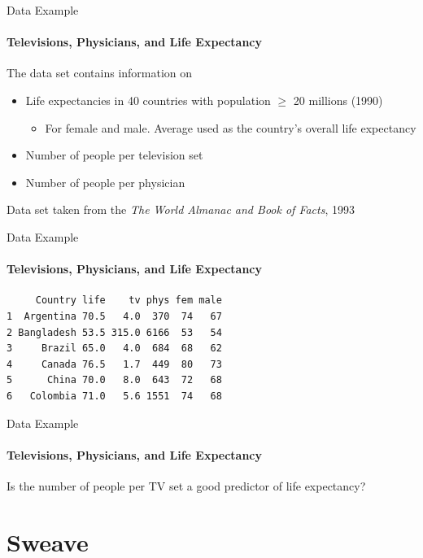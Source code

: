 \documentclass[paper=screen,mathserif]{beamer}
\begin{document}
\begin{frame}{Data Example}
  \framesubtitle{Televisions, Physicians, and Life Expectancy}
  The data set contains information on
  \begin{itemize}
  \item Life expectancies in 40 countries with population $\geq$ 20
    millions (1990)
    \begin{itemize}
    \item For female and male. Average used as the country's overall
      life expectancy
    \end{itemize}
  \item Number of people per television set 
  \item Number of people per physician 
  \end{itemize}
  Data set taken from the {\em The World Almanac and Book of Facts},
  1993
\end{frame}

\begin{frame}[fragile]{Data Example}
  \framesubtitle{Televisions, Physicians, and Life Expectancy}
\begin{verbatim}
     Country life    tv phys fem male
1  Argentina 70.5   4.0  370  74   67
2 Bangladesh 53.5 315.0 6166  53   54
3     Brazil 65.0   4.0  684  68   62
4     Canada 76.5   1.7  449  80   73
5      China 70.0   8.0  643  72   68
6   Colombia 71.0   5.6 1551  74   68
\end{verbatim}
\end{frame}

\begin{frame}{Data Example}
  \framesubtitle{Televisions, Physicians, and Life Expectancy}
  
  Is the number of people per TV set a good predictor of life expectancy?

\end{frame}

\section{Sweave}
\end{document}
